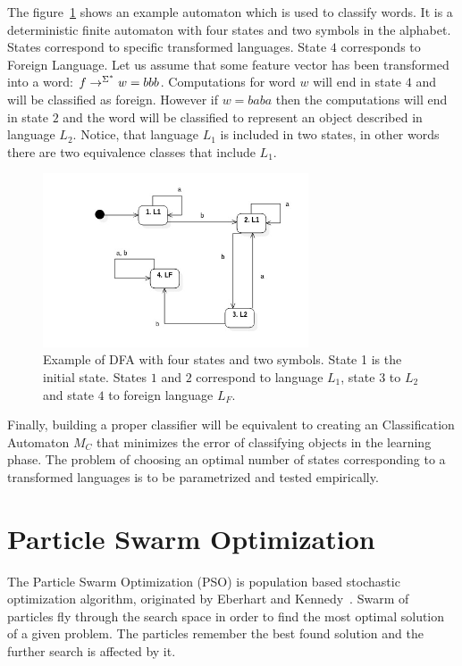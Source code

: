 \documentclass{mini}
\begin{document}
The figure~\ref{fig:class_dfa} shows an example automaton which is used to classify words. It is a deterministic finite automaton with four states and two symbols in the alphabet. States correspond to specific transformed languages. State $4$ corresponds to Foreign Language. Let us assume that some feature vector has been transformed into a word: $f \rightarrow^{\Sigma^{*}} w = bbb$. Computations for word $w$ will end in state $4$ and will be classified as foreign. However if $w = baba$ then the computations will end in state $2$ and the word will be classified to represent an object described in language $L_2$. Notice, that language $L_1$ is included in two states, in other words there are two equivalence classes that include $L_1$.

\begin{figure}[H]
    \centering
    \includegraphics[width=0.7\textwidth]{../uml/states/dfa.jpg}
    \caption{Example of DFA with four states and two symbols. State 1 is the initial state. States $1$ and $2$ correspond to language $L_{1}$, state $3$ to $L_2$ and state $4$ to foreign language $L_F$.}
    \label{fig:class_dfa}
\end{figure}

Finally, building a proper classifier will be equivalent to creating an Classification Automaton $M_{C}$ that minimizes the error of classifying objects in the learning phase. The problem of choosing an optimal number of states corresponding to a transformed languages is to be parametrized and tested empirically.


\chapter{Particle Swarm Optimization}\label{chap:pso}

The Particle Swarm Optimization (PSO) is population based stochastic optimization algorithm, originated by Eberhart and Kennedy~\cite{pso_origin}. Swarm of particles fly through the search space in order to find the most optimal solution of a given problem. The particles remember the best found solution and the further search is affected by it.
\end{document}
